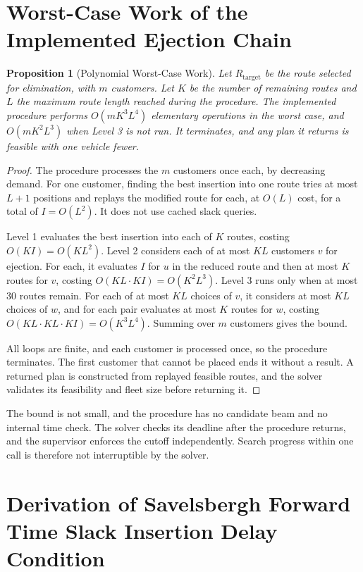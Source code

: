 \documentclass{article}
\newtheorem{proposition}{Proposition}
\begin{document}
\section{Worst-Case Work of the Implemented Ejection Chain}
\label{sec:supp_gec}

\begin{proposition}[Polynomial Worst-Case Work]
Let $R_{\text{target}}$ be the route selected for elimination, with $m$ customers. Let $K$ be the number of remaining routes and $L$ the maximum route length reached during the procedure. The implemented procedure performs $O(m K^3 L^4)$ elementary operations in the worst case, and $O(m K^2 L^3)$ when Level 3 is not run. It terminates, and any plan it returns is feasible with one vehicle fewer.
\end{proposition}

\begin{proof}
The procedure processes the $m$ customers once each, by decreasing demand. For one customer, finding the best insertion into one route tries at most $L+1$ positions and replays the modified route for each, at $O(L)$ cost, for a total of $I = O(L^2)$. It does not use cached slack queries.

Level 1 evaluates the best insertion into each of $K$ routes, costing $O(K I) = O(K L^2)$. Level 2 considers each of at most $KL$ customers $v$ for ejection. For each, it evaluates $I$ for $u$ in the reduced route and then at most $K$ routes for $v$, costing $O(KL \cdot K I) = O(K^2 L^3)$. Level 3 runs only when at most 30 routes remain. For each of at most $KL$ choices of $v$, it considers at most $KL$ choices of $w$, and for each pair evaluates at most $K$ routes for $w$, costing $O(KL \cdot KL \cdot K I) = O(K^3 L^4)$. Summing over $m$ customers gives the bound.

All loops are finite, and each customer is processed once, so the procedure terminates. The first customer that cannot be placed ends it without a result. A returned plan is constructed from replayed feasible routes, and the solver validates its feasibility and fleet size before returning it.
\end{proof}

The bound is not small, and the procedure has no candidate beam and no internal time check. The solver checks its deadline after the procedure returns, and the supervisor enforces the cutoff independently. Search progress within one call is therefore not interruptible by the solver.

\section{Derivation of Savelsbergh Forward Time Slack Insertion Delay Condition}
\end{document}

